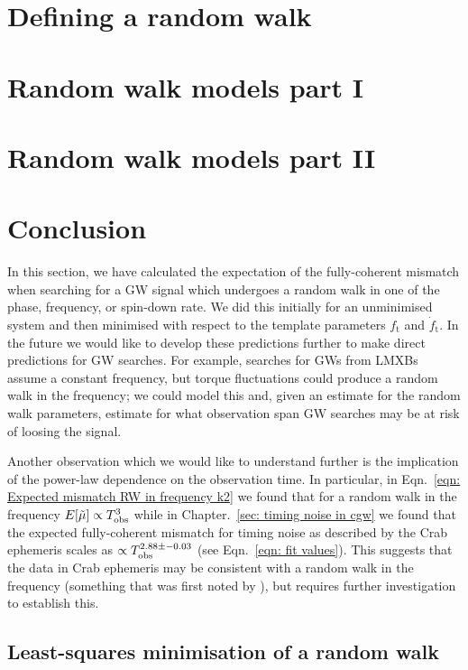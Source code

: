 \documentclass[../full_thesis/full_thesis.tex]{subfiles}
\newcommand{\thisdir}{../analytic_timing_noise_cgw}
\begin{document}
\section{Defining a random walk}
\label{sec: Defining a random walk}


\section{Random walk models part I}
\label{sec: Random walk models part I}


\section{Random walk models part II} 
\label{sec: Random walk models part II}


\section{Conclusion}

In this section, we have calculated the expectation of the fully-coherent
mismatch when searching for a GW signal which undergoes a random walk in one of
the phase, frequency, or spin-down rate. We did this initially for an
unminimised system and then minimised with respect to the template parameters
$f_\textrm{t}$ and $\dot{f}_\textrm{t}$. In the future we would like to develop
these predictions further to make direct predictions for GW searches. For example,
searches for GWs from LMXBs assume a constant frequency, but torque fluctuations
could produce a random walk in the frequency; we could model this and, given
an estimate for the random walk parameters, estimate for what observation span
GW searches may be at risk of loosing the signal.

Another observation which we would like to understand further is the
implication of the power-law dependence on the observation time. In particular,
in Eqn.~\eqref{eqn: Expected mismatch RW in frequency k2} we found that for
a random walk in the frequency
$E[\tilde{\mu}] \propto T_{\mathrm{obs}} ^{3}$ while in Chapter.~\ref{sec: timing noise in
cgw} we found that the expected fully-coherent mismatch for timing noise as
described by the Crab ephemeris scales as $\propto T_{\mathrm{obs}}^{2.88\pm-0.03}$ (see
Eqn.~\eqref{eqn: fit values}). This suggests that the data in Crab ephemeris
may be consistent with a random walk in the frequency (something that was
first noted by \citet{Boynton1972}), but requires further investigation to
establish this.


\begin{subappendices}


\section{Least-squares minimisation of a random walk}
\label{sec: least squares minimisation of a random walk}



\end{subappendices}


\biblio
\end{document}
